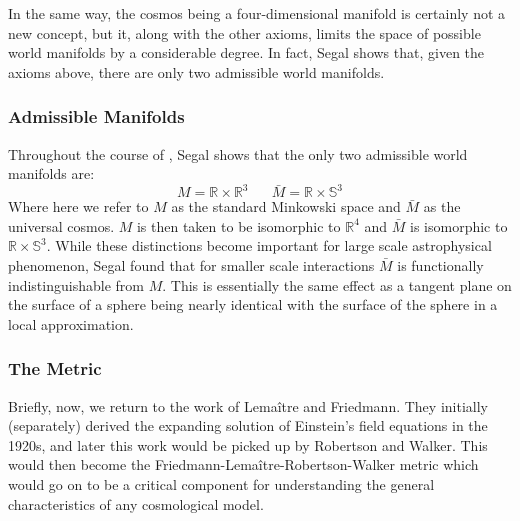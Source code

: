 \documentclass[a4paper]{article}
\begin{document}
    In the same way, the cosmos being a four-dimensional manifold is certainly
    not a new concept, but it, along with the other axioms, limits the space of
    possible world manifolds by a considerable degree. In fact, Segal shows
    that, given the axioms above, there are only two admissible world
    manifolds\cite{segal_b}. 


    \subsubsection{Admissible Manifolds}
    Throughout the course of \cite{segal_b}, Segal shows that the only two
    admissible world manifolds are:
    \[
        M = \mathbb{R} \times \mathbb{R}^3 \;\;\;\;\;\; 
        \bar{M} = \mathbb{R} \times \mathbb{S}^3
    \]
    Where here we refer to $M$ as the standard Minkowski space and $\bar{M}$ as
    the universal cosmos. $M$ is then taken to be isomorphic to $\mathbb{R}^4$
    and $\bar{M}$ is isomorphic to $\mathbb{R} \times \mathbb{S}^3$. While
    these distinctions become important for large scale astrophysical
    phenomenon, Segal found that for smaller scale interactions  $\bar{M}$ is
    functionally indistinguishable from $M$. This is essentially the same
    effect as a tangent plane on the surface of a sphere being nearly identical
    with the surface of the sphere in a local approximation. 

    \subsubsection{The Metric}
    Briefly, now, we return to the work of Lema\^{i}tre and Friedmann. They
    initially (separately) derived the expanding solution of Einstein's field
    equations in the 1920s, and later this work would be picked up by Robertson
    and Walker. This would then become the Friedmann-Lema\^{i}tre-Robertson-Walker
    metric which would go on to be a critical component for understanding the
    general characteristics of any cosmological model.
\end{document}
